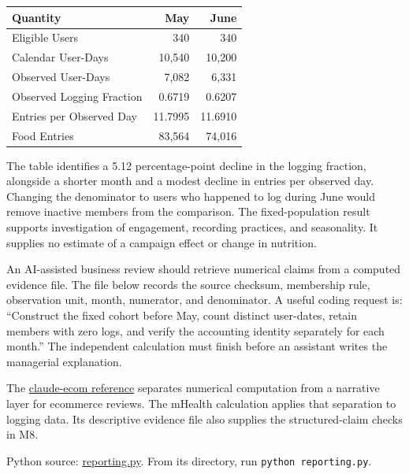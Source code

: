 \begin{table}[H]
\centering\small
\begin{tabular}{@{}lrr@{}}
\toprule
Quantity & May & June \\
\midrule

Eligible Users & 340 & 340 \\
Calendar User-Days & 10,540 & 10,200 \\
Observed User-Days & 7,082 & 6,331 \\
Observed Logging Fraction & 0.6719 & 0.6207 \\
Entries per Observed Day & 11.7995 & 11.6910 \\
Food Entries & 83,564 & 74,016 \\
\bottomrule
\end{tabular}
\end{table}

The table identifies a 5.12 percentage-point decline in the logging
fraction, alongside a shorter month and a modest decline in entries per
observed day. Changing the denominator to users who happened to log
during June would remove inactive members from the comparison. The
fixed-population result supports investigation of engagement, recording
practices, and seasonality. It supplies no estimate of a campaign effect
or change in nutrition.

An AI-assisted business review should retrieve numerical claims from a
computed evidence file. The file below records the source checksum,
membership rule, observation unit, month, numerator, and denominator. A
useful coding request is: ``Construct the fixed cohort before May, count
distinct user-dates, retain members with zero logs, and verify the
accounting identity separately for each month.'' The independent
calculation must finish before an assistant writes the managerial
explanation.

The \href{https://github.com/takechanman1228/claude-ecom}{claude-ecom
reference} separates numerical computation from a narrative layer for
ecommerce reviews. The mHealth calculation applies that separation to
logging data. Its descriptive evidence file also supplies the
structured-claim checks in M8.

\FloatBarrier
{}
Python source:
\href{../03_Data_and_Code/mHealth/recurring_examples/reporting.py}{reporting.py}.
From its directory, run \texttt{python\ reporting.py}.

